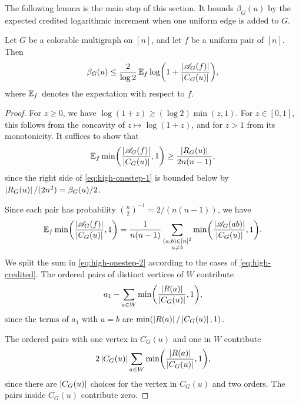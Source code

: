 The following lemma is the main step of this section. It bounds $\beta_G(u)$ by the expected credited logarithmic increment when one uniform edge is added to $G$.

\begin{lemma}\label{lem:high-onestep}
Let $G$ be a colorable multigraph on $[n]$, and let $f$ be a uniform pair of $[n]$. Then
\begin{equation}\label{eq:high-onestep}
\beta_G(u) \le \frac{2}{\log 2} \, \mathbb E_f \log \biggl( 1 + \frac{\left|\mathscr{A}_G(f)\right|}{\left|C_G(u)\right|} \biggr),
\end{equation}
where $\mathbb E_f$ denotes the expectation with respect to $f$.
\end{lemma}

\begin{proof}
For $z \ge 0$, we have $\log(1 + z) \ge (\log 2) \min(z, 1)$. For $z \in [0, 1]$, this follows from the concavity of $z \mapsto \log(1 + z)$, and for $z > 1$ from its monotonicity. It suffices to show that
\begin{equation}\label{eq:high-onestep-1}
\mathbb E_f \min \biggl( \frac{\left|\mathscr{A}_G(f)\right|}{\left|C_G(u)\right|}, 1 \biggr) \ge \frac{\left|R_G(u)\right|}{2 n (n - 1)},
\end{equation}
since the right side of \eqref{eq:high-onestep-1} is bounded below by $\left|R_G(u)\right| / (2n^2) = \beta_G(u)/2$.

Since each pair has probability $\binom{n}{2}^{-1} = 2/(n(n - 1))$, we have
\begin{equation}\label{eq:high-onestep-2}
\mathbb E_f \min \biggl( \frac{\left|\mathscr{A}_G(f)\right|}{\left|C_G(u)\right|}, 1 \biggr) = \frac{1}{n(n - 1)} \sum_{\substack{(a, b) \in [n]^2 \\ a \ne b}} \min \biggl( \frac{\left|\mathscr{A}_G(ab)\right|}{\left|C_G(u)\right|}, 1 \biggr).
\end{equation}
We split the sum in \eqref{eq:high-onestep-2} according to the cases of \eqref{eq:high-credited}. The ordered pairs of distinct vertices of $W$ contribute
\[
a_1 - \sum_{a \in W} \min \biggl( \frac{\left|R(a)\right|}{\left|C_G(u)\right|}, 1 \biggr),
\]
since the terms of $a_1$ with $a = b$ are $\min(\left|R(a)\right| / \left|C_G(u)\right|, 1)$.

The ordered pairs with one vertex in $C_G(u)$ and one in $W$ contribute
\[
2 \left|C_G(u)\right| \sum_{a \in W} \min \biggl( \frac{\left|R(a)\right|}{\left|C_G(u)\right|}, 1 \biggr),
\]
since there are $\left|C_G(u)\right|$ choices for the vertex in $C_G(u)$ and two orders. The pairs inside $C_G(u)$ contribute zero.


\end{proof}
